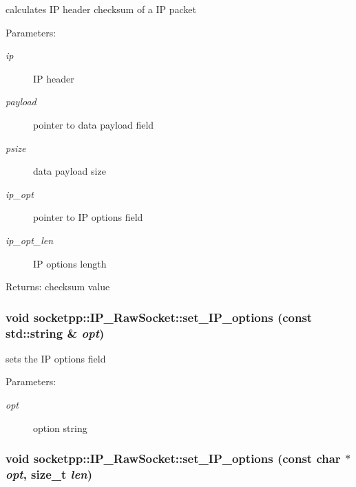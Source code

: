 calculates IP header checksum of a IP packet 

\begin{Desc}
\item[Parameters:]
\begin{description}
\item[{\em ip}]IP header \item[{\em payload}]pointer to data payload field \item[{\em psize}]data payload size \item[{\em ip\_\-opt}]pointer to IP options field \item[{\em ip\_\-opt\_\-len}]IP options length \end{description}
\end{Desc}
\begin{Desc}
\item[Returns:]checksum value \end{Desc}
\hypertarget{classsocketpp_1_1IP__RawSocket_9d88ecec5e362b3cf3d3dbc51d5dd0cd}{
\subsubsection[{set\_\-IP\_\-options}]{\setlength{\rightskip}{0pt plus 5cm}void socketpp::IP\_\-RawSocket::set\_\-IP\_\-options (const std::string \& {\em opt})}}
\label{classsocketpp_1_1IP__RawSocket_9d88ecec5e362b3cf3d3dbc51d5dd0cd}


sets the IP options field 

\begin{Desc}
\item[Parameters:]
\begin{description}
\item[{\em opt}]option string \end{description}
\end{Desc}
\hypertarget{classsocketpp_1_1IP__RawSocket_82c0b2c75d081bc84d8e60bf18199e65}{
\subsubsection[{set\_\-IP\_\-options}]{\setlength{\rightskip}{0pt plus 5cm}void socketpp::IP\_\-RawSocket::set\_\-IP\_\-options (const char $\ast$ {\em opt}, \/  size\_\-t {\em len})}}
\label{classsocketpp_1_1IP__RawSocket_82c0b2c75d081bc84d8e60bf18199e65}


